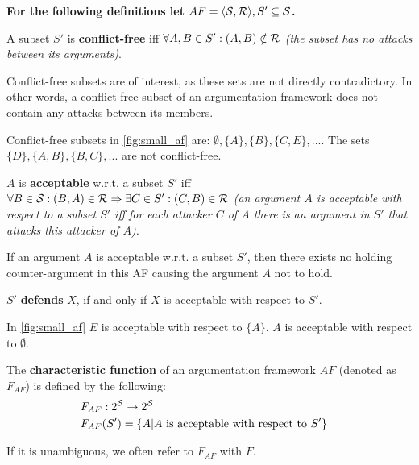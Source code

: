 \textbf{For the following definitions let $AF=\langle \S, \R \rangle, S' \subseteq \S$.}

\begin{definition}
	A subset $S'$ is \textbf{conflict-free} iff $ \forall A, B \in S': (A, B) \notin \R$ \textit{(the subset has no attacks between its arguments)}.
\end{definition}
\begin{remark}
	Conflict-free subsets are of interest, as these sets are not directly contradictory. In other words, a conflict-free subset of an argumentation framework does not contain any attacks between its members.
\end{remark}
\begin{exa}
Conflict-free subsets in \autoref{fig:small_af} are: $\emptyset, \{A\}, \{B\}, \{C, E\}, ...$. The sets $\{D\}, \{A, B\}, \{B, C\}, ...$ are not conflict-free.
\end{exa}

\begin{definition}
$A$ is \textbf{acceptable} w.r.t. a subset $S'$ iff  $\forall B \in \S: (B, A) \in \R \Rightarrow \exists C \in S': (C, B) \in \R$ \textit{(an argument $A$ is acceptable with respect to a subset $S'$ iff for each attacker $C$ of $A$ there is an argument in $S'$ that attacks this attacker of $A$). }
\end{definition}

\begin{remark}
If an argument $A$ is acceptable w.r.t. a subset $S'$, then there exists no holding counter-argument in this \gls{AF} causing the argument $A$ not to hold.
\end{remark}

\begin{lemma}
	$S'$ \textbf{defends} $X$, if and only if $X$ is acceptable with respect to $S'$.
\end{lemma}

\begin{exa}
In  \autoref{fig:small_af} $E$ is acceptable with respect to $\{A\}$. $A$ is acceptable with respect to $\emptyset$. 
\end{exa}


\begin{definition}
The \textbf{characteristic function} of an argumentation framework $AF$ (denoted as $F_{AF}$) is defined by the following:
	\begin{align*}
		&F_{AF}: 2^{\S} \rightarrow 2^\S &\\
		&F_{AF}(S') = \{A | A~\text{is acceptable with respect to}~S'\} &
	\end{align*}
\end{definition}
\begin{notation}
	If it is unambiguous, we often refer to $F_{AF}$ with $F$. 
\end{notation}

